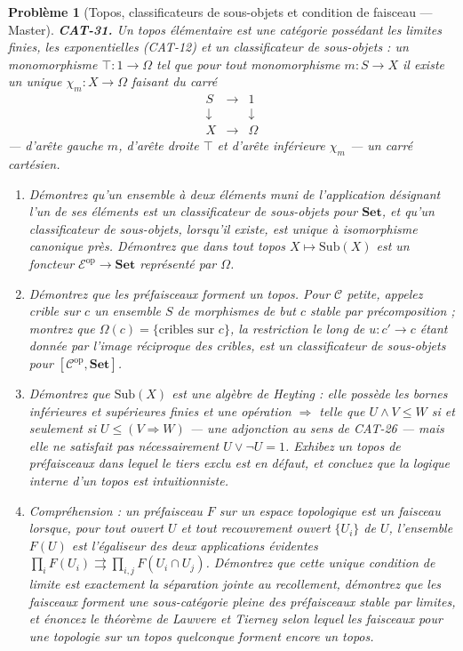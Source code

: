 \documentclass[11pt]{article}
\newtheorem{problem}{Problème}
\begin{document}
\begin{problem}[{Topos, classificateurs de sous-objets et condition de faisceau --- Master}]
\textbf{CAT-31.} Un \textit{topos élémentaire} est une catégorie possédant les limites finies, les
exponentielles (CAT-12) et un \textit{classificateur de sous-objets} : un monomorphisme
$ \top \colon 1 \to \Omega $ tel que pour tout monomorphisme $ m \colon S \to X $ il existe un
unique $ \chi_m \colon X \to \Omega $ faisant du carré
\[ \begin{array}{ccc}
S & \longrightarrow & 1 \\
\downarrow & & \downarrow \\
X & \longrightarrow & \Omega
\end{array} \]
--- d'arête gauche $ m $, d'arête droite $ \top $ et d'arête inférieure $ \chi_m $ --- un carré
cartésien.
\begin{enumerate}
\item[(a)] Démontrez qu'un ensemble à deux éléments muni de l'application désignant l'un de ses éléments
est un classificateur de sous-objets pour $ \mathbf{Set} $, et qu'un classificateur de
sous-objets, lorsqu'il existe, est unique à isomorphisme canonique près. Démontrez que dans tout
topos $ X \mapsto \mathrm{Sub}(X) $ est un foncteur
$ \mathcal{E}^{\mathrm{op}} \to \mathbf{Set} $ représenté par $ \Omega $.
\item[(b)] Démontrez que les préfaisceaux forment un topos. Pour $ \mathcal{C} $ petite, appelez
\textit{crible} sur $ c $ un ensemble $ S $ de morphismes de but $ c $ stable par
précomposition ; montrez que $ \Omega(c) = \{ \text{cribles sur } c \} $, la restriction le long
de $ u \colon c' \to c $ étant donnée par l'image réciproque des cribles, est un classificateur
de sous-objets pour $ [\mathcal{C}^{\mathrm{op}}, \mathbf{Set}] $.
\item[(c)] Démontrez que $ \mathrm{Sub}(X) $ est une algèbre de Heyting : elle possède les bornes
inférieures et supérieures finies et une opération $ \Rightarrow $ telle que
$ U \wedge V \le W $ si et seulement si $ U \le (V \Rightarrow W) $ --- une adjonction au sens
de CAT-26 --- mais elle ne satisfait pas nécessairement $ U \vee \neg U = 1 $. Exhibez un topos de
préfaisceaux dans lequel le tiers exclu est en défaut, et concluez que la logique interne d'un
topos est intuitionniste.
\item[(d)] Compréhension : un préfaisceau $ F $ sur un espace topologique est un \textit{faisceau}
lorsque, pour tout ouvert $ U $ et tout recouvrement ouvert $ \{ U_i \} $ de $ U $,
l'ensemble $ F(U) $ est l'égaliseur des deux applications évidentes
$ \prod_i F(U_i) \rightrightarrows \prod_{i,j} F(U_i \cap U_j) $. Démontrez que cette unique
condition de limite est exactement la séparation jointe au recollement, démontrez que les
faisceaux forment une sous-catégorie pleine des préfaisceaux stable par limites, et énoncez le
théorème de Lawvere et Tierney selon lequel les faisceaux pour une topologie sur un topos
quelconque forment encore un topos.
\end{enumerate}

\end{problem}
\end{document}
